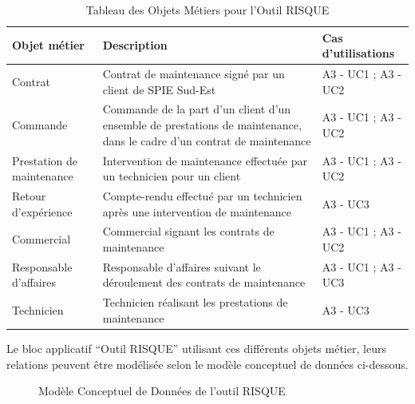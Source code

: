 \begin{table}[H]
    \begin{tabular}{p{3cm}|p{10cm}|p{3cm}}
    Objet métier & Description & Cas d'utilisations \\ \hline
    Contrat & Contrat de maintenance signé par un client de SPIE Sud-Est & A3 - UC1 ; A3 - UC2 \\ \hline
    Commande & Commande de la part d’un client d’un ensemble de prestations de maintenance, dans le cadre d’un contrat de maintenance & A3 - UC1 ; A3 - UC2 \\ \hline
    Prestation de maintenance & Intervention de maintenance effectuée par un technicien pour un client & A3 - UC1 ; A3 - UC2 \\ \hline
    Retour d’expérience & Compte-rendu effectué par un technicien après une intervention de maintenance & A3 - UC3 \\ \hline
    Commercial & Commercial signant les contrats de maintenance & A3 - UC1 ; A3 - UC2 \\ \hline
    Responsable d’affaires & Responsable d’affaires suivant le déroulement des contrats de maintenance & A3 - UC1 ; A3 - UC3 \\ \hline
    Technicien & Technicien réalisant les prestations de maintenance & A3 - UC3 \\
    \end{tabular}
    \caption{Tableau des Objets Métiers pour l'Outil RISQUE}
\end{table}

Le bloc applicatif “Outil RISQUE” utilisant ces différents objets métier, leurs relations peuvent être modélisée selon le modèle conceptuel de données ci-dessous.

\begin{figure}[H]
    \label{fig-om-risque}
    \noindent{}
    \caption{Modèle Conceptuel de Données de l'outil RISQUE}
\end{figure}

